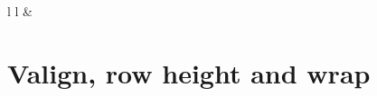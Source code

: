 \documentclass[
]{article}
\begin{document}
\begin{table}[ht]
\begin{centerbox}
\begin{threeparttable}
\begin{tabular}{l l}
 &
 \tabularnewline[-0.5pt]


\end{tabular}
\end{threeparttable}\par\end{centerbox}

\end{table}
 

\FloatBarrier

\hypertarget{valign-row-height-and-wrap}{%
\section{Valign, row height and wrap}\label{valign-row-height-and-wrap}}

 
  \providecommand{\huxb}[2]{\arrayrulecolor[RGB]{#1}\global\arrayrulewidth=#2pt}
  \providecommand{\huxvb}[2]{\color[RGB]{#1}\vrule width #2pt}
  \providecommand{\huxtpad}[1]{\rule{0pt}{#1}}
  \providecommand{\huxbpad}[1]{\rule[-#1]{0pt}{#1}}
\end{document}

